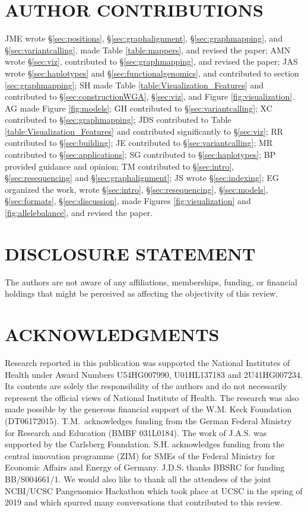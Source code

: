 

\section*{AUTHOR CONTRIBUTIONS}

JME wrote \S \ref{sec:positions}, \S \ref{sec:graphalignment}, \S \ref{sec:graphmapping}, and \S \ref{sec:variantcalling}, made Table \ref{table:mappers}, and revised the paper;
AMN wrote \S \ref{sec:viz}, contributed to \S \ref{sec:graphmapping}, and revised the paper;
JAS wrote \S \ref{sec:haplotypes} and \S \ref{sec:functionalgenomics}, and contributed to section \ref{sec:graphmapping};
SH made Table \ref{table:Visualization_Features} and contributed to \S \ref{sec:constructionWGA}, \S \ref{sec:viz}, and Figure \ref{fig:visualization}.
AG made Figure \ref{fig:models};
GH contributed to \S \ref{sec:variantcalling};
XC contributed to \S \ref{sec:graphmapping};
JDS contributed to Table \ref{table:Visualization_Features} and contributed significantly to \S \ref{sec:viz};
RR contributed to \S \ref{sec:building};
JE contributed to \S \ref{sec:variantcalling};
MR contributed to \S \ref{sec:applications};
SG contributed to \S \ref{sec:haplotypes};
BP provided guidance and opinion;
TM contributed to \S \ref{sec:intro}, \S \ref{sec:resequencing} and \S \ref{sec:graphalignment};
JS wrote \S \ref{sec:indexing};
EG organized the work, wrote \S \ref{sec:intro}, \S \ref{sec:resequencing}, \S \ref{sec:models}, \S \ref{sec:formats}, \S \ref{sec:discussion}, made Figures \ref{fig:visualization} and \ref{fig:allelebalance}, and revised the paper.

\section*{DISCLOSURE STATEMENT}
The authors are not aware of any affiliations, memberships, funding, or financial holdings that
might be perceived as affecting the objectivity of this review. 

\section*{ACKNOWLEDGMENTS}
Research reported in this publication was supported the National Institutes of Health under Award Numbers U54HG007990, U01HL137183 and 2U41HG007234.
Its contents are solely the responsibility of the authors and do not necessarily represent the official views of National Institute of Health.
The research was also made possible by the generous financial support of the W.M. Keck Foundation (DT06172015).
T.M.\ acknowledges funding from the German Federal Ministry for Research and Education (BMBF 031L0184).
The work of J.A.S. was supported by the Carlsberg Foundation.
S.H. acknowledges funding from the central innovation programme (ZIM) for SMEs of the Federal Ministry for Economic Affairs and Energy of Germany.
J.D.S. thanks BBSRC for funding BB/S004661/1.
We would also like to thank all the attendees of the joint NCBI/UCSC Pangenomics Hackathon which took place at UCSC in the spring of 2019 and which spurred many conversations that contributed to this review.
